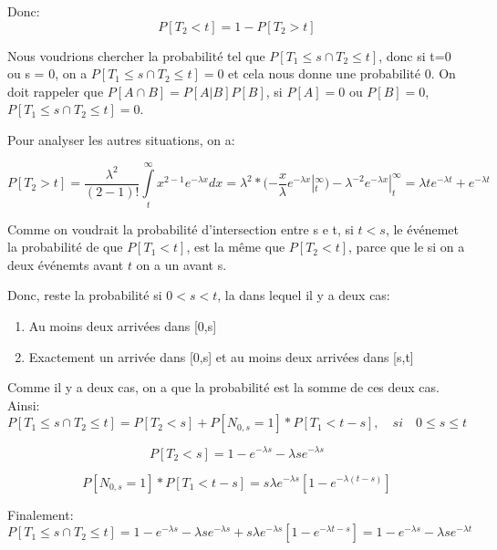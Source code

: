 \documentclass[a4paper]{article}
\begin{document}
Donc:
\begin{equation}
P[T_2 < t] =1 - P[T_2 > t]
\end{equation}

Nous voudrions  chercher la probabilité tel  que $P[T_1\leq s  \cap T_2\leq t]$,
donc si t=0 ou s = 0, on a $P[{T_1  \leq s} \cap {T_2 \leq t}] = 0$ et cela nous
donne une  probabilité 0.  On doit  rappeler que $P[A  \cap B]=P[A|B]P[B]  $, si
$P[A]=0$ ou $P[B]=0$, $P[{T_1  \leq s} \cap {T_2 \leq t}] = 0$.

Pour analyser les autres situations, on a:

\begin{equation*}
P[T_2 > t] = \frac{\lambda ^2}{(2 - 1)!}\int\limits_t^\infty{x^{2-1}}e^{-\lambda x}dx= \lambda ^2 *(-\frac{x}{\lambda} e^{-\lambda x} |_t^\infty)- \lambda^{-2} e^{-\lambda x}|_t^\infty = \lambda te^{-\lambda t} + e^{-\lambda t}
\end{equation*}

Comme  on voudrait  la probabilité  d'intersection  entre s  e t,  si $t<s$,  le
événemet la probabilité  de que $P[T_1 <t]$, est la même  que $P[T_2 <t]$, parce
que le si on a deux événemts avant $t$ on a un avant s.

Donc, reste la probabilité si $0<s<t$, la dans lequel il y a deux cas:
\begin{enumerate}
\item Au moins deux arrivées dans [0,s]
\item Exactement un arrivée dans [0,s] et au moins deux arrivées dans [s,t]
\end{enumerate}

Comme il y a deux cas, on a que la probabilité est la somme de ces deux cas.
Ainsi:
\begin{equation}
P[{T_1 \leq s} \cap {T_2 \leq t}] = P[T_2 < s] + P[N_{0,s}=1]*P[T_1<t-s], \quad si 
\quad 0
\leq s \leq t
\end{equation}

\begin{equation*}
P[T_2 < s]= 1 - e^{-\lambda s}- \lambda s e^{-\lambda s}
\end{equation*}

\begin{equation*}
P[N_{0,s}=1]*P[T_1<t-s]=s\lambda e^{-\lambda s}[1-e^{-\lambda{(t-s)}}]
\end{equation*}

Finalement:
\begin{equation}
P[{T_1 \leq s} \cap  {T_2 \leq t}] =
1   -   e^{-\lambda   s}-   \lambda  s   e^{-\lambda   s}+s\lambda   e^{-\lambda
  s}[1-e^{-\lambda{t-s}}]= 1 - e^{-\lambda s} - \lambda se^{-\lambda   t}
\end{equation}
\end{document}
